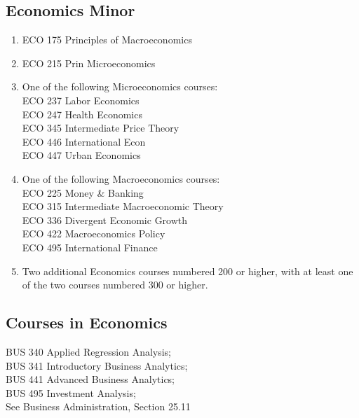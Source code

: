 \documentclass[
  letterpaper,
]{scrbook}
\providecommand{\tightlist}{%
  \setlength{\itemsep}{0pt}\setlength{\parskip}{0pt}}
\begin{document}
\subsection{Economics Minor}\label{economics-minor}

\begin{enumerate}
\def\labelenumi{\arabic{enumi}.}
\tightlist
\item
  ECO 175 Principles of Macroeconomics
\item
  ECO 215 Prin Microeconomics
\item
  One of the following Microeconomics courses:\\
  ECO 237 Labor Economics\\
  ECO 247 Health Economics\\
  ECO 345 Intermediate Price Theory\\
  ECO 446 International Econ\\
  ECO 447 Urban Economics\\
\item
  One of the following Macroeconomics courses:\\
  ECO 225 Money \& Banking\\
  ECO 315 Intermediate Macroeconomic Theory\\
  ECO 336 Divergent Economic Growth\\
  ECO 422 Macroeconomics Policy\\
  ECO 495 International Finance\\
\item
  Two additional Economics courses numbered 200 or higher, with at least
  one of the two courses numbered 300 or higher.
\end{enumerate}

\subsection{Courses in Economics}\label{courses-in-economics}

BUS 340 Applied Regression Analysis;\\
BUS 341 Introductory Business Analytics;\\
BUS 441 Advanced Business Analytics;\\
BUS 495 Investment Analysis;\\
See Business Administration, Section 25.11
\end{document}
